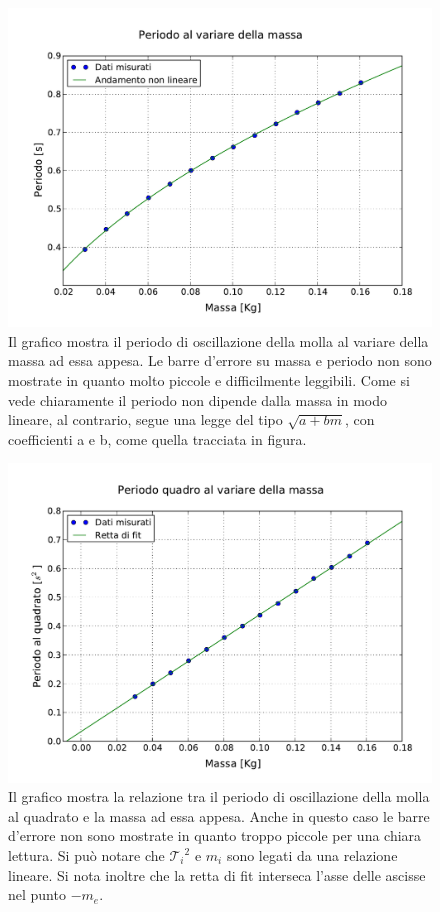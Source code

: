 \begin{figure}
    \centering
    \includegraphics[width=120mm]{immagini/periodo_massa.pdf}
    \caption{Il grafico mostra il periodo di oscillazione della molla al variare della massa ad essa appesa.
        Le barre d'errore su massa e periodo non sono mostrate in quanto molto piccole e difficilmente leggibili.
        Come si vede chiaramente il periodo non dipende dalla massa in modo lineare, al contrario, segue una legge del tipo
        $\sqrt{a + bm}$, con coefficienti a e b, come quella tracciata in figura.}
    \label{fig:periodo_massa}
\end{figure}

\begin{figure}
    \centering
    \includegraphics[width=120mm]{immagini/periodo2_massa.pdf}
    \caption{Il grafico mostra la relazione tra il periodo di oscillazione della molla al quadrato e la massa ad essa appesa.
        Anche in questo caso le barre d'errore non sono mostrate in quanto troppo piccole per una chiara lettura.
        Si può notare che ${\mathcal{T}_i}^2$ e $m_i$ sono legati da una relazione lineare. Si nota inoltre che la retta di fit
        interseca l'asse delle ascisse nel punto $-m_e$.}
    \label{fig:periodo2_massa}
\end{figure}

